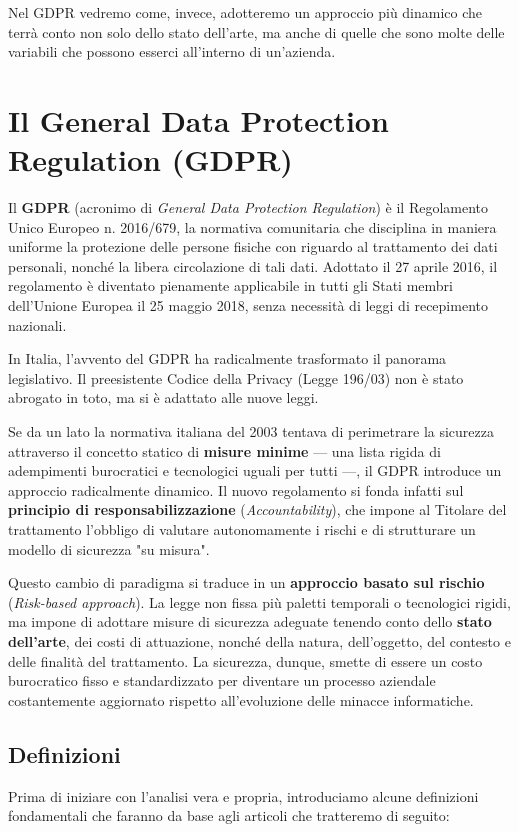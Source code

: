 Nel GDPR vedremo come, invece, adotteremo un approccio più dinamico che terrà conto non solo dello stato dell'arte, ma anche di quelle che sono molte delle variabili che possono esserci all'interno di un'azienda. 

\section{Il General Data Protection Regulation (GDPR)}

Il \textbf{GDPR} (acronimo di \textit{General Data Protection Regulation}) è il Regolamento Unico Europeo n. 2016/679, la normativa comunitaria che disciplina in maniera uniforme la protezione delle persone fisiche con riguardo al trattamento dei dati personali, nonché la libera circolazione di tali dati. Adottato il 27 aprile 2016, il regolamento è diventato pienamente applicabile in tutti gli Stati membri dell'Unione Europea il 25 maggio 2018, senza necessità di leggi di recepimento nazionali.

In Italia, l'avvento del GDPR ha radicalmente trasformato il panorama legislativo. Il preesistente Codice della Privacy (Legge 196/03) non è stato abrogato in toto, ma si è adattato alle nuove leggi. 

Se da un lato la normativa italiana del 2003 tentava di perimetrare la sicurezza attraverso il concetto statico di \textbf{misure minime} — una lista rigida di adempimenti burocratici e tecnologici uguali per tutti —, il GDPR introduce un approccio radicalmente dinamico. Il nuovo regolamento si fonda infatti sul \textbf{principio di responsabilizzazione} (\textit{Accountability}), che impone al Titolare del trattamento l'obbligo di valutare autonomamente i rischi e di strutturare un modello di sicurezza "su misura".

Questo cambio di paradigma si traduce in un \textbf{approccio basato sul rischio} (\textit{Risk-based approach}). 
La legge non fissa più paletti temporali o tecnologici rigidi, ma impone di adottare misure di sicurezza adeguate tenendo conto dello \textbf{stato dell'arte}, dei costi di attuazione, nonché della natura, dell'oggetto, del contesto e delle finalità del trattamento. La sicurezza, dunque, smette di essere un costo burocratico fisso e standardizzato per diventare un processo aziendale costantemente aggiornato rispetto all'evoluzione delle minacce informatiche.
\subsection{Definizioni}
Prima di iniziare con l'analisi vera e propria, introduciamo alcune definizioni fondamentali che faranno da base agli articoli che tratteremo di seguito:

